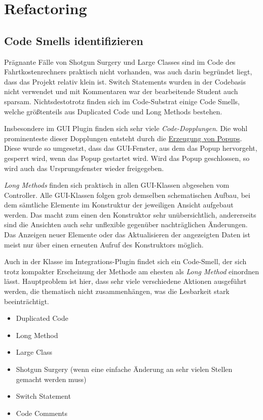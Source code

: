 \chapter{Refactoring}

\section{Code Smells identifizieren}
Prägnante Fälle von Shotgun Surgery und Large Classes sind im Code des Fahrtkostenrechners praktisch nicht vorhanden, was auch darin begründet liegt, dass das Projekt relativ klein ist.
Switch Statements wurden in der Codebasis nicht verwendet und mit Kommentaren war der bearbeitende Student auch sparsam.
Nichtsdestotrotz finden sich im Code-Substrat einige Code Smells, welche größtenteils aus Duplicated Code und Long Methods bestehen.

Insbesondere im GUI Plugin finden sich sehr viele \emph{Code-Dopplungen}.
Die wohl prominenteste dieser Dopplungen entsteht durch die \href{https://github.com/yschiebelhut/carpool-java/blob/6a206569e676ad1bf55d68ba3e64408bae83e73f/0-carpool-java-plugin-ui/src/main/java/gui/MainGUI.java#L42}{Erzeugung von Popups}.
Diese wurde so umgesetzt, dass das GUI-Fenster, aus dem das Popup hervorgeht, gesperrt wird, wenn das Popup gestartet wird.
Wird das Popup geschlossen, so wird auch das Ursprungsfenster wieder freigegeben.

\emph{Long Methods} finden sich praktisch in allen GUI-Klassen abgesehen vom Controller.
Alle GUI-Klassen folgen grob demselben schematischen Aufbau, bei dem sämtliche Elemente im Konstruktur der jeweiligen Ansicht aufgebaut werden.
Das macht zum einen den Konstruktor sehr unübersichtlich, andererseits sind die Ansichten auch sehr unflexible gegenüber nachträglichen Änderungen.
Das Anzeigen neuer Elemente oder das Aktualisieren der angezeigten Daten ist meist nur über einen erneuten Aufruf des Konstruktors möglich.

Auch in der Klasse  im Integrations-Plugin findet sich ein Code-Smell, der sich trotz kompakter Erscheinung der Methode am ehesten als \emph{Long Method} einordnen lässt.
Hauptproblem ist hier, dass sehr viele verschiedene Aktionen ausgeführt werden, die thematisch nicht zusammenhängen, was die Lesbarkeit stark beeinträchtigt.



\begin{itemize}
    \item Duplicated Code
    \item Long Method
    \item Large Class
    \item Shotgun Surgery (wenn eine einfache Änderung an sehr vielen Stellen gemacht werden muss)
    \item Switch Statement
    \item Code Comments
\end{itemize}

